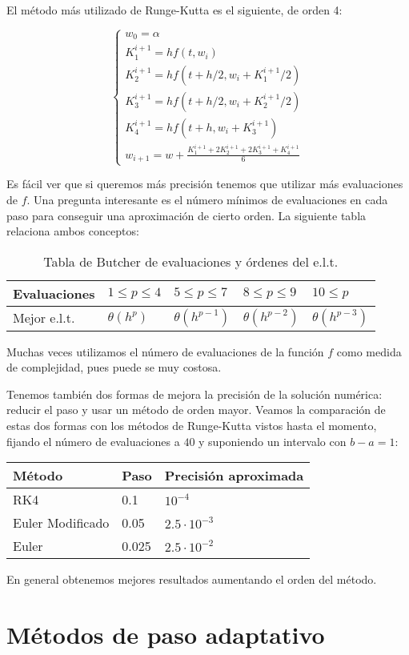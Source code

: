 El método más utilizado de Runge-Kutta es el siguiente, de orden 4:

\begin{definition}
\begin{equation}
\begin{cases}
    w_0=\alpha \\
    K_1^{i+1} = hf(t,w_i)\\
    K_2^{i+1} = hf(t + h/2,w_i+ K_1^{i+1}/2)\\
    K_3^{i+1} = hf(t + h/2,w_i+ K_2^{i+1}/2)\\
    K_4^{i+1} = hf(t + h,w_i + K_3^{i+1})\\

    w_{i+1}=w + \frac{K_1^{i+1} + 2K_2^{i+1} + 2K_3^{i+1} + K_4^{i+1}}{6}
\end{cases}
\end{equation}

\end{definition}


Es fácil ver que si queremos más precisión tenemos que utilizar más evaluaciones de $f$. Una pregunta interesante es el número mínimos de evaluaciones en cada paso para conseguir una aproximación de cierto orden. La siguiente tabla relaciona ambos conceptos:

\begin{table}[H]
\centering
\begin{tabular}{|l||l|l|l|l|}
    \hline
Evaluaciones & $1\le p \le 4$ & $5\le p\le 7$ & $8\le p\le 9$  & $10\le p$ \\
    \hline
Mejor e.l.t. & $\theta(h^p)$ & $\theta(h^{p-1})$ & $\theta(h^{p-2})$ & $\theta(h^{p-3})$ \\
    \hline
\end{tabular}
\caption{Tabla de Butcher de evaluaciones y órdenes del e.l.t.}
\end{table}

Muchas veces utilizamos el número de evaluaciones de la función $f$ como medida de complejidad, pues puede se muy costosa.

Tenemos también dos formas de mejora la precisión de la solución numérica: reducir el paso y usar un método de orden mayor. Veamos la comparación de estas dos formas con los métodos de Runge-Kutta vistos hasta el momento, fijando el número de evaluaciones a $40$ y suponiendo un intervalo con $b-a=1$:

\begin{table}[H]
\centering
\begin{tabular}{|l|l|l|}
    \hline
Método           & Paso  & Precisión aproximada \\
    \hline
    \hline
RK4              & 0.1   & $10^{-4}$ \\
    \hline
Euler Modificado & 0.05  & $2.5\cdot 10^{-3}$ \\
    \hline
Euler            & 0.025 & $2.5\cdot 10^{-2}$ \\
    \hline
\end{tabular}
\end{table}

En general obtenemos mejores resultados aumentando el orden del método.


\section{Métodos de paso adaptativo}
